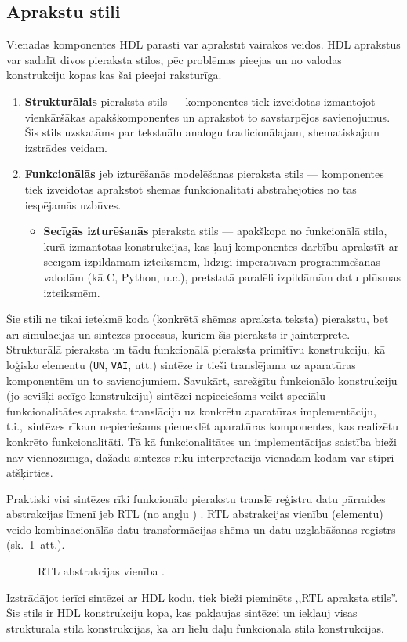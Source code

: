 \subsection{Aprakstu stili} \label{sec:hdl-styles}
Vienādas komponentes HDL parasti var aprakstīt vairākos veidos.
HDL aprakstus var sadalīt divos pieraksta stilos, pēc problēmas pieejas un
no valodas konstrukciju kopas kas šai pieejai raksturīga.
\begin{enumerate}
	\item \textbf{Strukturālais} pieraksta stils --- komponentes tiek
		izveidotas izmantojot vienkāršākas apakškomponentes un aprakstot 
		to savstarpējos
		savienojumus. Šis stils uzskatāms par tekstuālu analogu
		tradicionālajam, shematiskajam izstrādes veidam.
	\item \textbf{Funkcionālās} jeb izturēšanās modelēšanas pieraksta
		stils --- komponentes tiek izveidotas aprakstot shēmas funkcionalitāti
		abstrahējoties no tās iespējamās uzbūves.
	\begin{itemize}
		\item \textbf{Secīgās izturēšanās} pieraksta stils --- apakškopa
			no funkcionālā stila, kurā izmantotas konstrukcijas, kas ļauj
			komponentes darbību aprakstīt ar secīgām izpildāmām izteiksmēm,
			līdzīgi imperatīvām programmēšanas valodām (kā C, Python, u.c.),
			pretstatā paralēli izpildāmām datu plūsmas izteiksmēm.
	\end{itemize}
\end{enumerate}
\pagebreak[3]

Šie stili ne tikai ietekmē koda (konkrētā shēmas apraksta teksta) pierakstu,
bet arī simulācijas un sintēzes procesus, kuriem šis pieraksts ir jāinterpretē.
Strukturālā pieraksta un tādu funkcionālā pieraksta primitīvu konstrukciju,
kā loģisko elementu (\texttt{UN}, \texttt{VAI}, utt.)
sintēze ir tieši translējama uz aparatūras komponentēm un to savienojumiem.
Savukārt, sarežģītu funkcionālo konstrukciju (jo sevišķi secīgo
konstrukciju) sintēzei nepieciešams veikt speciālu funkcionalitātes apraksta
translāciju uz konkrētu aparatūras implementāciju, t.i.,~sintēzes rīkam nepieciešams
piemeklēt aparatūras komponentes, kas realizētu konkrēto funkcionalitāti.
Tā kā funkcionalitātes un implementācijas saistība bieži nav viennozīmīga,
dažādu sintēzes rīku interpretācija vienādam kodam var stipri atšķirties.

Praktiski visi sintēzes rīki funkcionālo pierakstu translē %
reģistru datu pārraides abstrakcijas līmenī jeb RTL
(no angļu ) \cite[2.~lpp.]{HDL}%
\cite[235.~lpp.]{Perry-VHDL}.
RTL abstrakcijas vienību (elementu) veido kombinacionālās datu transformācijas shēma un
datu uzglabāšanas reģistrs (sk.~\ref{fig:rtl}~att.).
\begin{figure}[thb]
	\centering
	\def\svgscale{1.25}
	
	\caption[RTL abstrakcijas vienība.]{RTL abstrakcijas vienība \cite[233.~lpp.]{Perry-VHDL}.}
	\label{fig:rtl}
\end{figure}
Izstrādājot ierīci sintēzei ar HDL kodu, tiek bieži pieminēts
,,RTL apraksta stils''. Šis stils ir HDL konstrukciju kopa, kas
pakļaujas sintēzei un iekļauj visas strukturālā stila konstrukcijas, kā arī
lielu daļu funkcionālā stila konstrukcijas.

